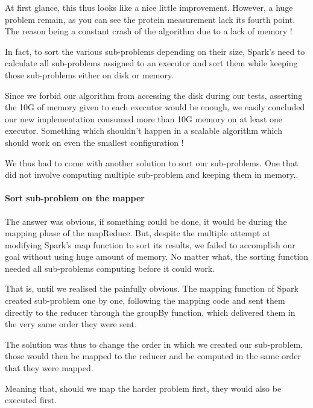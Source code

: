 \documentclass{eplmastersthesis}
\begin{document}
At first glance, this thus looks like a nice little improvement. However, a huge problem remain, as you can see the protein measurement lack its fourth point. The reason being a constant crash of the algorithm due to a lack of memory ! \newline

In fact, to sort the various sub-problems depending on their size, Spark's need to calculate all sub-problems assigned to an executor and sort them while keeping those sub-problems either on disk or memory. \newline

Since we forbid our algorithm from accessing the disk during our tests, asserting the 10G of memory given to each executor would be enough, we easily concluded our new implementation consumed more than 10G memory on at least one executor. Something which shouldn't happen in a scalable algorithm  which should work on even the smallest configuration ! \newline

We thus had to come with another solution to sort our sub-problems. One that did not involve computing multiple sub-problem and keeping them in memory..

\paragraph{Sort sub-problem on the mapper}

The answer was obvious, if something could be done, it would be during the mapping phase of the mapReduce. But, despite the multiple attempt at modifying Spark's map function to sort its results, we failed to accomplish our goal without using huge amount of memory. No matter what, the sorting function needed all sub-problems computing before it could work. \newline

That is, until we realised the painfully obvious. The mapping function of Spark created sub-problem one by one, following the mapping code and sent them directly to the reducer through the groupBy function, which delivered them in the very same order they were sent. \newline

The solution was thus to change the order in which we created our sub-problem, those would then be mapped to the reducer and be computed in the same order that they were mapped.\newline

Meaning that, should we map the harder problem first, they would also be executed first. \newline
\end{document}
